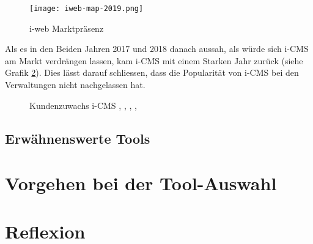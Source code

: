 \begin{figure}[h]
  \centering
  \texttt{[image: iweb-map-2019.png]}
  \caption{i-web Marktpräsenz \parencite[S. 14]{iweb2019revue}}
  \label{fig: iwebmap2019}
\end{figure}

Als es in den Beiden Jahren 2017 und 2018 danach aussah, als würde sich i-CMS am Markt verdrängen lassen, kam i-CMS mit einem Starken Jahr zurück (siehe Grafik \ref{fig:icmszuwachs}). Dies lässt darauf schliessen, dass die Popularität von i-CMS bei den Verwaltungen nicht nachgelassen hat.


\begin{figure}[h]
  \centering
  \caption{Kundenzuwachs i-CMS \parencite[S. 14]{iweb2015revue}, \parencite[S. 14]{iweb2016revue}, \parencite[S. 14]{iweb2017revue}, \parencite[S. 14]{iweb2018revue}, \parencite[S. 14]{iweb2019revue}}
  \label{fig:icmszuwachs}
\end{figure}

\subsection{Erwähnenswerte Tools}

\section{Vorgehen bei der Tool-Auswahl}


\section{Reflexion}